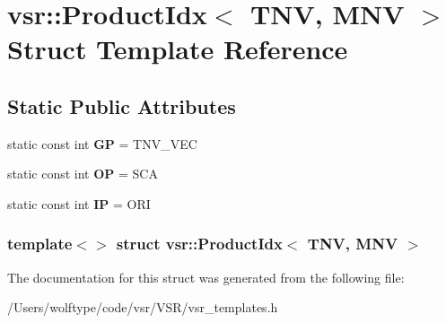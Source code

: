 \hypertarget{structvsr_1_1_product_idx_3_01_t_n_v_00_01_m_n_v_01_4}{\section{vsr\-:\-:Product\-Idx$<$ T\-N\-V, M\-N\-V $>$ Struct Template Reference}
\label{structvsr_1_1_product_idx_3_01_t_n_v_00_01_m_n_v_01_4}
}
\subsection*{Static Public Attributes}
\begin{DoxyCompactItemize}
\item 
\hypertarget{structvsr_1_1_product_idx_3_01_t_n_v_00_01_m_n_v_01_4_a07b27e3c1d9ff012c5636a38ec9cdd20}{static const int {\bfseries G\-P} = T\-N\-V\-\_\-\-V\-E\-C}\label{structvsr_1_1_product_idx_3_01_t_n_v_00_01_m_n_v_01_4_a07b27e3c1d9ff012c5636a38ec9cdd20}

\item 
\hypertarget{structvsr_1_1_product_idx_3_01_t_n_v_00_01_m_n_v_01_4_ad3a451fc2287e2e83d55d442533782a4}{static const int {\bfseries O\-P} = S\-C\-A}\label{structvsr_1_1_product_idx_3_01_t_n_v_00_01_m_n_v_01_4_ad3a451fc2287e2e83d55d442533782a4}

\item 
\hypertarget{structvsr_1_1_product_idx_3_01_t_n_v_00_01_m_n_v_01_4_a1264ec818cd736210e7444229fd6df51}{static const int {\bfseries I\-P} = O\-R\-I}\label{structvsr_1_1_product_idx_3_01_t_n_v_00_01_m_n_v_01_4_a1264ec818cd736210e7444229fd6df51}

\end{DoxyCompactItemize}
\subsubsection*{template$<$$>$ struct vsr\-::\-Product\-Idx$<$ T\-N\-V, M\-N\-V $>$}



The documentation for this struct was generated from the following file\-:\begin{DoxyCompactItemize}
\item 
/\-Users/wolftype/code/vsr/\-V\-S\-R/vsr\-\_\-templates.\-h\end{DoxyCompactItemize}
